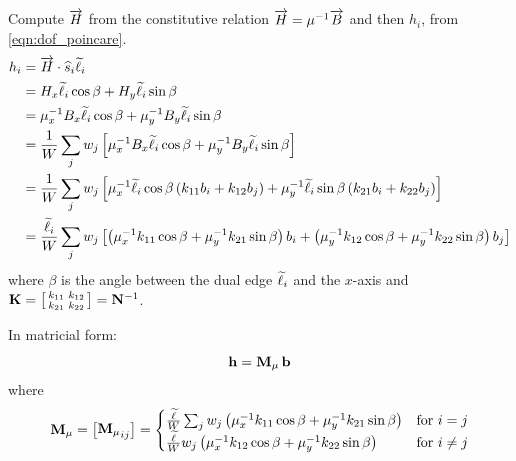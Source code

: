 \begin{enumerate}
  Compute $\overrightarrow{H}$ from the constitutive relation $\overrightarrow{H} = \mu^{-1} \overrightarrow{B}$ and
  then $h_i$, from \eqref{eqn:dof_poincare}.\\
  \newline
  \begin{equation} \label{eqn:constitutive_magnetic_poincare} \begin{split}
    h_i & = {\overrightarrow{H} \cdot \widehat{s}_i} \widetilde{\ell}_i \\
    & = H_x \widetilde{\ell}_i \cos\beta + H_y \widetilde{\ell}_i \sin\beta \\
    & = \mu_x^{-1} B_x \widetilde{\ell}_i \cos\beta +
    \mu_y^{-1} B_y \widetilde{\ell}_i \sin\beta \\
    & = \frac{1}{W} \sum_j w_j \left[ \mu_x^{-1} B_x \widetilde{\ell}_i
    \cos\beta + \mu_y^{-1} B_y \widetilde{\ell}_i
    \sin\beta \right] \\
    & = \frac{1}{W} \sum_j w_j \left[ \mu_x^{-1} \widetilde{\ell}_i
    \cos\beta \left( k_{11} b_i + k_{12} b_j \right) +
    \mu_y^{-1} \widetilde{\ell}_i \sin\beta \left( k_{21} b_i +
    k_{22} b_j \right) \right] \\
    & = \frac{\widetilde{\ell}_i}{W} \sum_j w_j \left[ \left( \mu_x^{-1} k_{11}
    \cos\beta + \mu_y^{-1} k_{21} \sin\beta
    \right) b_i + \left( \mu_y^{-1} k_{12}
    \cos\beta + \mu_y^{-1} k_{22} \sin\beta
    \right) b_j \right]
  \end{split} \end{equation}
  where $\beta$ is the angle between the dual edge $\widetilde{\ell}_i$ and
  the $x$-axis and $\mathbf{K} = \bigl[ \begin{smallmatrix}
  k_{11}&k_{12}\\k_{21}&k_{22} \end{smallmatrix} \bigr] =
  \mathbf{N}^{-1}$.
  
  In matricial form:
  \begin{equation*}
    \mathbf{h} = {\mathbf{M}_\mu\,\mathbf{b}}
  \end{equation*}
  where
  \begin{equation} \label{eqn:constitutive_poincare}
    \mathbf{M}_\mu = \begin{bmatrix}
      {\mathbf{M}_\mu}_{ij}
    \end{bmatrix} = \begin{cases}
      \frac{\widetilde{\ell}}{W} \sum_j w_j 
    \left( \mu_x^{-1} k_{11} \cos\beta + \mu_y^{-1} k_{21} \sin\beta
    \right) & \text{for $i = j$} \\
      \frac{\widetilde{\ell}}{W} w_j 
    \left( \mu_x^{-1} k_{12} \cos\beta + \mu_y^{-1} k_{22} \sin\beta
    \right) & \text{for $i \neq j$} \\
    \end{cases}
  \end{equation}
\end{enumerate}

